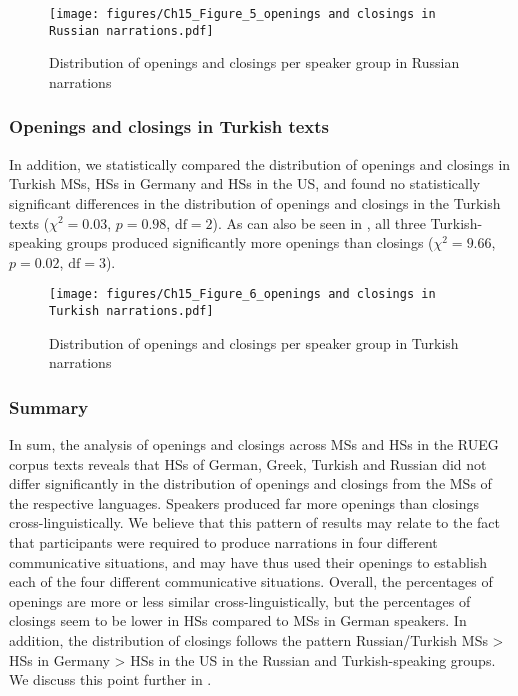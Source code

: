 \documentclass[output=paper,colorlinks,citecolor=brown]{langscibook}
\begin{document}
\begin{figure}
    \texttt{[image: figures/Ch15\_Figure\_5\_openings and closings in Russian narrations.pdf]}
    \caption{Distribution of openings and closings per speaker group in Russian narrations}
    \label{fig:katsikaetal:Russianopeningsclosings}
\end{figure}

\subsubsection{Openings and closings in Turkish texts}
In addition, we statistically compared the distribution of openings and closings in Turkish MSs, HSs in Germany and HSs in the US, and found no statistically significant differences in the distribution of openings and closings in the Turkish texts ($\chi^2= 0.03$, $p = 0.98$, $\text{df} = 2$). As can also be seen in , all three Turkish-speaking groups produced significantly more openings than closings ($\chi^2 = 9.66$, $p = 0.02$, $\text{df} = 3$).

\begin{figure}
    \texttt{[image: figures/Ch15\_Figure\_6\_openings and closings in Turkish narrations.pdf]}
    \caption{Distribution of openings and closings per speaker group in Turkish narrations}
    \label{fig:katsikaetal:Turkishopeningsclosings}
\end{figure}

\subsubsection{Summary}
In sum, the analysis of openings and closings across MSs and HSs in the RUEG corpus texts reveals that HSs of German, Greek, Turkish and Russian did not differ significantly in the distribution of openings and closings from the MSs of the respective languages. Speakers produced far more openings than closings cross-linguistically. We believe that this pattern of results may relate to the fact that participants were required to produce narrations in four different communicative situations, and may have thus used their openings to establish each of the four different communicative situations. Overall, the percentages of openings are more or less similar cross-linguistically, but the percentages of closings seem to be lower in HSs compared to MSs in German speakers. In addition, the distribution of closings follows the pattern Russian/Turkish MSs > HSs in Germany > HSs in the US in the Russian and Turkish-speaking groups. We discuss this point further in . 
\end{document}

